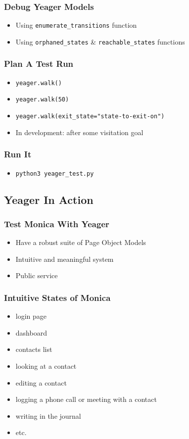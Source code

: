 \begin{frame}
  \frametitle{Debug Yeager Models}
  \begin{itemize}
    \item Using \texttt{enumerate\_transitions} function %
    \item Using \texttt{orphaned\_states} \& \texttt{reachable\_states} functions %
  \end{itemize}
\end{frame}

\begin{frame}
  \frametitle{Plan A Test Run}
  \begin{itemize}
    \item \texttt{yeager.walk()}
    \item \texttt{yeager.walk(50)}
    \item \texttt{yeager.walk(exit\_state="state-to-exit-on")}
    \item In development: after some visitation goal
  \end{itemize}
\end{frame}

\begin{frame}
  \frametitle{Run It}
  \begin{itemize}
    \item \texttt{python3 yeager\_test.py} %
  \end{itemize}
\end{frame}

\subsection{Yeager In Action}

\begin{frame}
  \frametitle{Test Monica With Yeager}
  \begin{itemize}
    \item Have a robust suite of Page Object Models
    \item Intuitive and meaningful system
    \item Public service
  \end{itemize}
\end{frame}

\begin{frame}
  \frametitle{Intuitive States of Monica}
  \begin{itemize}
    \item login page
    \item dashboard
    \item contacts list
    \item looking at a contact
    \item editing a contact
    \item logging a phone call or meeting with a contact
    \item writing in the journal
    \item etc.
  \end{itemize}
\end{frame}

